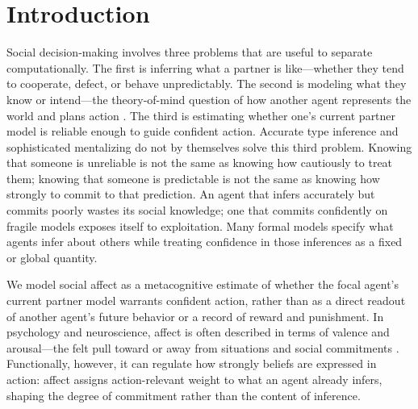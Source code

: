 \section{Introduction}

Social decision-making involves three problems that are useful to separate computationally. The first is inferring what a partner is like---whether they tend to cooperate, defect, or behave unpredictably. The second is modeling what they know or intend---the theory-of-mind question of how another agent represents the world and plans action \cite{FrithFrith2012,Hampton2008Mentalizing,Pitliya2025ToMActiveInference}. The third is estimating whether one's current partner model is reliable enough to guide confident action. Accurate type inference and sophisticated mentalizing do not by themselves solve this third problem. Knowing that someone is unreliable is not the same as knowing how cautiously to treat them; knowing that someone is predictable is not the same as knowing how strongly to commit to that prediction. An agent that infers accurately but commits poorly wastes its social knowledge; one that commits confidently on fragile models exposes itself to exploitation. Many formal models specify what agents infer about others while treating confidence in those inferences as a fixed or global quantity.

We model social affect as a metacognitive estimate of whether the focal agent's current partner model warrants confident action, rather than as a direct readout of another agent's future behavior or a record of reward and punishment. In psychology and neuroscience, affect is often described in terms of valence and arousal---the felt pull toward or away from situations and social commitments \cite{Barrett2006EmotionParadox}. Functionally, however, it can regulate how strongly beliefs are expressed in action: affect assigns action-relevant weight to what an agent already infers, shaping the degree of commitment rather than the content of inference.

